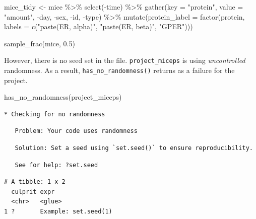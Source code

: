 \documentclass[12pt,twoside]{reedthesis}
\newenvironment{Shaded}{\begin{snugshade}}{\end{snugshade}}
\newcommand{\AttributeTok}[1]{\textcolor[rgb]{0.77,0.63,0.00}{#1}}
\newcommand{\FloatTok}[1]{\textcolor[rgb]{0.00,0.00,0.81}{#1}}
\newcommand{\FunctionTok}[1]{\textcolor[rgb]{0.00,0.00,0.00}{#1}}
\newcommand{\NormalTok}[1]{#1}
\newcommand{\OtherTok}[1]{\textcolor[rgb]{0.56,0.35,0.01}{#1}}
\newcommand{\SpecialCharTok}[1]{\textcolor[rgb]{0.00,0.00,0.00}{#1}}
\newcommand{\StringTok}[1]{\textcolor[rgb]{0.31,0.60,0.02}{#1}}
\begin{document}
\begin{Shaded}
\begin{Highlighting}[]
\NormalTok{mice\_tidy }\OtherTok{\textless{}{-}}\NormalTok{ mice }\SpecialCharTok{\%\textgreater{}\%} 
  \FunctionTok{select}\NormalTok{(}\SpecialCharTok{{-}}\NormalTok{time) }\SpecialCharTok{\%\textgreater{}\%} 
  \FunctionTok{gather}\NormalTok{(}\AttributeTok{key =} \StringTok{"protein"}\NormalTok{, }\AttributeTok{value =} \StringTok{"amount"}\NormalTok{, }\SpecialCharTok{{-}}\NormalTok{day, }\SpecialCharTok{{-}}\NormalTok{sex, }\SpecialCharTok{{-}}\NormalTok{id, }\SpecialCharTok{{-}}\NormalTok{type) }\SpecialCharTok{\%\textgreater{}\%} 
  \FunctionTok{mutate}\NormalTok{(}\AttributeTok{protein\_label =} \FunctionTok{factor}\NormalTok{(protein,}
           \AttributeTok{labels =} \FunctionTok{c}\NormalTok{(}\StringTok{"paste(ER, alpha)"}\NormalTok{, }\StringTok{"paste(ER, beta)"}\NormalTok{, }\StringTok{"GPER"}\NormalTok{)))}
\end{Highlighting}
\end{Shaded}
\begin{Shaded}
\begin{Highlighting}[]
\FunctionTok{sample\_frac}\NormalTok{(mice, }\FloatTok{0.5}\NormalTok{)}
\end{Highlighting}
\end{Shaded}
However, there is no seed set in the file. \texttt{project\_miceps} is using \emph{uncontrolled} randomness. As a result, \texttt{has\_no\_randomness()} returns as a failure for the project.
\begin{Shaded}
\begin{Highlighting}[]
\FunctionTok{has\_no\_randomness}\NormalTok{(}\StringTok{\textquotesingle{}project\_miceps\textquotesingle{}}\NormalTok{)}
\end{Highlighting}
\end{Shaded}
\begin{verbatim}
* Checking for no randomness
\end{verbatim}
\begin{verbatim}
   Problem: Your code uses randomness
\end{verbatim}
\begin{verbatim}
   Solution: Set a seed using `set.seed()` to ensure reproducibility.
\end{verbatim}
\begin{verbatim}
   See for help: ?set.seed
\end{verbatim}
\begin{verbatim}
# A tibble: 1 x 2
  culprit expr                
  <chr>   <glue>              
1 ?       Example: set.seed(1)
\end{verbatim}
\end{document}
